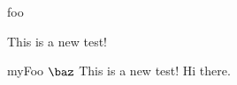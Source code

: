 \documentclass[extrefs, mh]{omdoc}
\begin{document}
\begin{omgroup}{foo}
\begin{module}[id=foo]
\end{module}

\begin{module}
 This is a new test!
\end{module}
\end{omgroup}

\begin{module}[id=hello]
\begin{omgroup}[id=newGroup, loadmodules]{myFoo $\protect\baz$}
 This is a new test! Hi there.
\end{omgroup}
\end{module}
\end{document}
